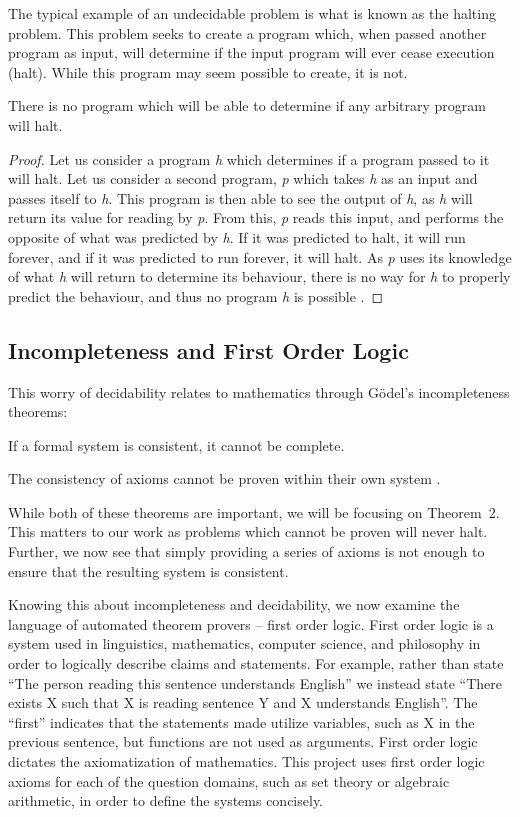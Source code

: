 The typical example of an undecidable problem is what is known as the halting problem. This problem seeks to create a program which, when passed another program as input, will determine if the input program will ever cease execution (halt). While this program may seem possible to create, it is not.

\begin{theorem}
There is no program which will be able to determine if any arbitrary program will halt.
\end{theorem}
\begin{proof}
Let us consider a program \textit{h} which determines if a program passed to it will halt. Let us consider a second program, \textit{p} which takes \textit{h} as an input and passes itself to \textit{h}. This program is then able to see the output of \textit{h}, as \textit{h} will return its value for reading by \textit{p}. From this, \textit{p} reads this input, and performs the opposite of what was predicted by \textit{h}. If it was predicted to halt, it will run forever, and if it was predicted to run forever, it will halt. As \textit{p} uses its knowledge of what \textit{h} will return to determine its behaviour, there is no way for \textit{h} to properly predict the behaviour, and thus no program \textit{h} is possible \cite{haltProof}.
\end{proof}

\subsection{Incompleteness and First Order Logic}\label{incompleteness}
This worry of decidability relates to mathematics through G\"odel's incompleteness theorems:
\begin{theorem}
If a formal system is consistent, it cannot be complete.
\end{theorem}
\begin{theorem}
	The consistency of axioms cannot be proven within their own system \cite{Godel}.
\end{theorem}

While both of these theorems are important, we will be focusing on Theorem~2. This matters to our work as problems which cannot be proven will never halt. Further, we now see that simply providing a series of axioms is not enough to ensure that the resulting system is consistent.

Knowing this about incompleteness and decidability, we now examine the language of automated theorem provers -- first order logic. First order logic is a system used in linguistics, mathematics, computer science, and philosophy in order to logically describe claims and statements. For example, rather than state ``The person reading this sentence understands English'' we instead state ``There exists X such that X is reading sentence Y and X understands English''. The ``first'' indicates that the statements made utilize variables, such as X in the previous sentence, but functions are not used as arguments. First order logic dictates the axiomatization of mathematics. This project uses first order logic axioms for each of the question domains, such as set theory or algebraic arithmetic, in order to define the systems concisely.

